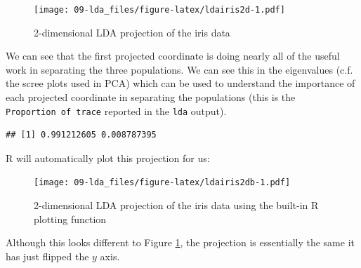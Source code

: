 \documentclass[
]{book}
\newenvironment{Shaded}{\begin{snugshade}}{\end{snugshade}}
\newcommand{\AttributeTok}[1]{\textcolor[rgb]{0.77,0.63,0.00}{#1}}
\newcommand{\DecValTok}[1]{\textcolor[rgb]{0.00,0.00,0.81}{#1}}
\newcommand{\FunctionTok}[1]{\textcolor[rgb]{0.00,0.00,0.00}{#1}}
\newcommand{\NormalTok}[1]{#1}
\newcommand{\OtherTok}[1]{\textcolor[rgb]{0.56,0.35,0.01}{#1}}
\newcommand{\SpecialCharTok}[1]{\textcolor[rgb]{0.00,0.00,0.00}{#1}}
\newcommand{\StringTok}[1]{\textcolor[rgb]{0.31,0.60,0.02}{#1}}
\theoremstyle{definition}
\theoremstyle{definition}
\theoremstyle{definition}
\theoremstyle{definition}
\theoremstyle{remark}
\begin{document}
\begin{figure}
\centering
\texttt{[image: 09-lda\_files/figure-latex/ldairis2d-1.pdf]}
\caption{\label{fig:ldairis2d}2-dimensional LDA projection of the iris data}
\end{figure}

We can see that the first projected coordinate is doing nearly all of the useful work in separating the three populations. We can see this in the eigenvalues (c.f. the scree plots used in PCA) which can be used to understand the importance of each projected coordinate in separating the populations (this is the \texttt{Proportion\ of\ trace} reported in the \texttt{lda} output).

\begin{Shaded}
\end{Shaded}

\begin{verbatim}
## [1] 0.991212605 0.008787395
\end{verbatim}

R will automatically plot this projection for us:

\begin{Shaded}
\end{Shaded}

\begin{figure}
\centering
\texttt{[image: 09-lda\_files/figure-latex/ldairis2db-1.pdf]}
\caption{\label{fig:ldairis2db}2-dimensional LDA projection of the iris data using the built-in R plotting function}
\end{figure}

Although this looks different to Figure \ref{fig:ldairis2d}, the projection is essentially the same it has just flipped the \(y\) axis.
\end{document}
